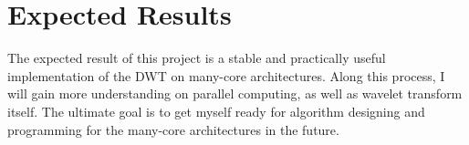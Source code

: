 \documentclass{article}
\begin{document}
\section{Expected Results}
%
The expected result of this project is a stable and practically useful 
implementation of the DWT on many-core architectures.
%
Along this process, I will gain more understanding on parallel
computing, as well as wavelet transform itself.
%
The ultimate goal is to get myself ready for algorithm designing and 
programming for the many-core architectures in the future.







\end{document}
